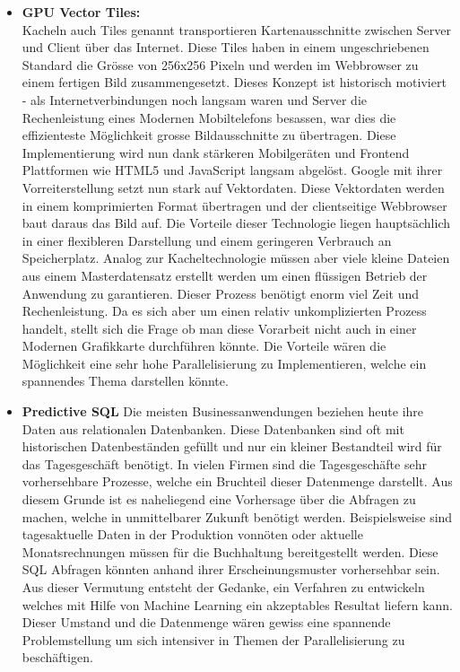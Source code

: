 \documentclass{article}
\begin{document}
\begin{itemize}
	\item{\textbf{GPU Vector Tiles:} \\
	 Kacheln auch Tiles genannt transportieren Kartenausschnitte zwischen Server und Client über das Internet. Diese Tiles haben in einem ungeschriebenen Standard die Grösse von 256x256 Pixeln und werden im Webbrowser zu einem fertigen Bild zusammengesetzt. Dieses Konzept ist historisch motiviert - als Internetverbindungen noch langsam waren und Server die Rechenleistung eines Modernen Mobiltelefons besassen, war dies die effizienteste Möglichkeit grosse Bildausschnitte zu übertragen. Diese Implementierung wird nun dank stärkeren Mobilgeräten und Frontend Plattformen wie HTML5 und JavaScript langsam abgelöst. Google mit ihrer Vorreiterstellung setzt nun stark auf Vektordaten. Diese Vektordaten werden in einem komprimierten Format übertragen und der clientseitige Webbrowser baut daraus das Bild auf. Die Vorteile dieser Technologie liegen hauptsächlich in einer flexibleren Darstellung und einem geringeren Verbrauch an Speicherplatz. Analog zur Kacheltechnologie müssen aber viele kleine Dateien aus einem Masterdatensatz erstellt werden um einen flüssigen Betrieb der Anwendung zu garantieren. Dieser Prozess benötigt enorm viel Zeit und Rechenleistung. Da es sich aber um einen relativ unkomplizierten Prozess handelt, stellt sich die Frage ob man diese Vorarbeit nicht auch in einer Modernen Grafikkarte durchführen könnte. Die Vorteile wären die Möglichkeit eine sehr hohe Parallelisierung zu Implementieren, welche ein spannendes Thema darstellen könnte.
	}

	\item{\textbf{Predictive SQL}
	Die meisten Businessanwendungen beziehen heute ihre Daten aus relationalen Datenbanken. Diese Datenbanken sind oft mit historischen Datenbeständen gefüllt und nur ein kleiner Bestandteil wird für das Tagesgeschäft benötigt. In vielen Firmen sind die Tagesgeschäfte sehr vorhersehbare Prozesse, welche ein Bruchteil dieser Datenmenge darstellt. Aus diesem Grunde ist es naheliegend eine Vorhersage über die Abfragen zu machen, welche in unmittelbarer Zukunft benötigt werden. Beispielsweise sind tagesaktuelle Daten in der Produktion vonnöten oder aktuelle Monatsrechnungen müssen für die Buchhaltung bereitgestellt werden. Diese SQL Abfragen könnten anhand ihrer Erscheinungsmuster vorhersehbar sein. Aus dieser Vermutung entsteht der Gedanke, ein Verfahren zu entwickeln welches mit Hilfe von Machine Learning ein akzeptables Resultat liefern kann. Dieser Umstand und die Datenmenge wären gewiss eine spannende Problemstellung um sich intensiver in Themen der Parallelisierung zu beschäftigen.
	}
	

\end{itemize}
\end{document}
